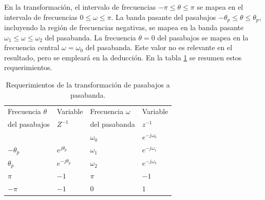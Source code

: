 \documentclass[a4paper]{report}
\begin{document}
En la transformación, el intervalo de frecuencias \(-\pi\leq\theta\leq\pi\) se mapea en el intervalo de frecuencias \(0\leq\omega\leq\pi\). La banda pasante del pasabajos \(-\theta_p\leq\theta\leq\theta_p\), incluyendo la región de frecuencias negativas, se mapea en la banda pasante \(\omega_1\leq\omega\leq\omega_2\) del pasabanda. La frecuencia \(\theta=0\) del pasabajos se mapea en la frecuencia central \(\omega=\omega_0\) del pasabanda. Este valor no es relevante en el resultado, pero se empleará en la deducción. En la tabla \ref{tab:filter_design_frequency_transform_low_bandpass_variables} se resumen estos requerimientos.
\begin{table}[ht!]
\begin{center}
\begin{tabular}{|>{\centering\arraybackslash}p{3cm}|>{\centering\arraybackslash}p{3cm}|>{\centering\arraybackslash}p{3cm}|>{\centering\arraybackslash}p{3cm}|}\hline
Frecuencia \(\theta\) & Variable           & Frecuencia \(\omega\) & Variable \\
del pasabajos         & \(Z^{-1}\)         & del pasabanda         & \(z^{-1}\)\\ \hline\hline
 0                    &  1                 & \(\omega_0\)          & \(e^{-j\omega_0}\) \\ \hline
 \(-\theta_p\)        & \(e^{j\theta_p}\)  & \(\omega_1\)          & \(e^{-j\omega_1}\) \\ \hline
 \(\theta_p\)         & \(e^{-j\theta_p}\) & \(\omega_2\)          & \(e^{-j\omega_2}\) \\ \hline
 \(\pi\)              & \(-1\)             & \(\pi\)               & \(-1\) \\ \hline
 \(-\pi\)             & \(-1\)             & \(0\)                 & \(1\) \\ \hline
\end{tabular}
\end{center}\caption{Requerimientos de la transformación de pasabajos a pasabanda.}\label{tab:filter_design_frequency_transform_low_bandpass_variables}
\end{table} 
\end{document}
